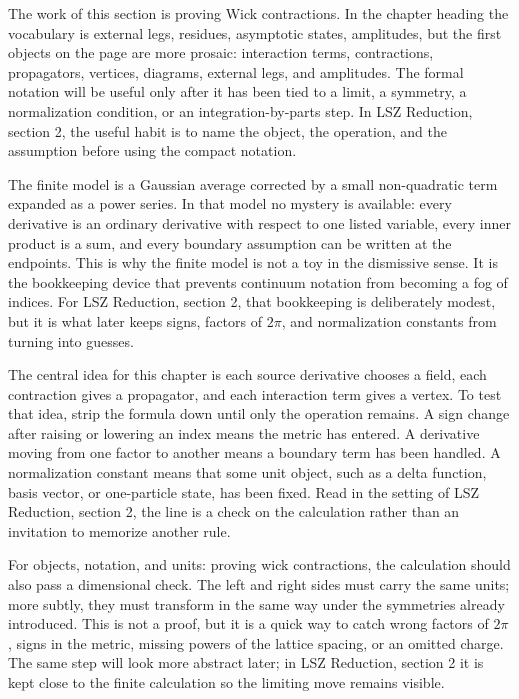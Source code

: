 The work of this section is proving Wick contractions.  In the chapter heading the vocabulary is external legs, residues, asymptotic states, amplitudes, but the first objects on the page are more prosaic: interaction terms, contractions, propagators, vertices, diagrams, external legs, and amplitudes.  The formal notation will be useful only after it has been tied to a limit, a symmetry, a normalization condition, or an integration-by-parts step.  In LSZ Reduction, section 2, the useful habit is to name the object, the operation, and the assumption before using the compact notation.

The finite model is a Gaussian average corrected by a small non-quadratic term expanded as a power series.  In that model no mystery is available: every derivative is an ordinary derivative with respect to one listed variable, every inner product is a sum, and every boundary assumption can be written at the endpoints.  This is why the finite model is not a toy in the dismissive sense.  It is the bookkeeping device that prevents continuum notation from becoming a fog of indices.  For LSZ Reduction, section 2, that bookkeeping is deliberately modest, but it is what later keeps signs, factors of \(2\pi\), and normalization constants from turning into guesses.

The central idea for this chapter is each source derivative chooses a field, each contraction gives a propagator, and each interaction term gives a vertex.  To test that idea, strip the formula down until only the operation remains.  A sign change after raising or lowering an index means the metric has entered.  A derivative moving from one factor to another means a boundary term has been handled.  A normalization constant means that some unit object, such as a delta function, basis vector, or one-particle state, has been fixed.  Read in the setting of LSZ Reduction, section 2, the line is a check on the calculation rather than an invitation to memorize another rule.

For objects, notation, and units: proving wick contractions, the calculation should also pass a dimensional check.  The left and right sides must carry the same units; more subtly, they must transform in the same way under the symmetries already introduced.  This is not a proof, but it is a quick way to catch wrong factors of \(2\pi\), signs in the metric, missing powers of the lattice spacing, or an omitted charge.  The same step will look more abstract later; in LSZ Reduction, section 2 it is kept close to the finite calculation so the limiting move remains visible.

